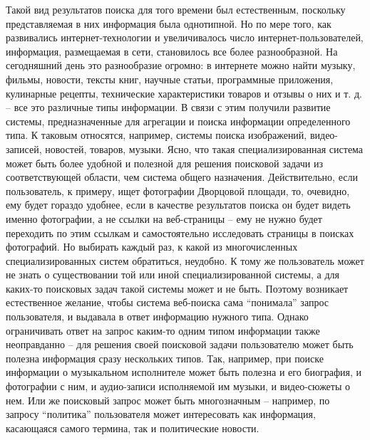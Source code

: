 \documentclass[12pt,a4paper]{report}
\newcommand\note[1]{\textcolor{red}{(#1)}}
\begin{document}
Такой вид результатов поиска для того времени был естественным, поскольку представляемая в них информация была однотипной.
Но по мере того, как развивались интернет-технологии и увеличивалось число интернет-пользователей, информация, размещаемая в сети, становилось все более разнообразной. На сегодняшний день это разнообразие огромно: в интернете можно найти музыку, фильмы, новости, тексты книг, научные статьи, программные приложения, кулинарные рецепты, технические характеристики товаров и отзывы о них и т. д. -- все это различные типы информации. В связи с этим получили развитие системы, предназначенные для агрегации и поиска информации определенного типа. К таковым относятся, например, системы поиска изображений, видео-записей, новостей, товаров, музыки. 
Ясно, что такая специализированная система может быть более удобной и полезной для решения поисковой задачи из соответствующей области, чем система общего назначения. 
Действительно, если пользователь, к примеру, ищет фотографии Дворцовой площади, то, очевидно, ему будет гораздо удобнее, если в качестве результатов поиска он будет видеть именно фотографии, а не ссылки на веб-страницы -- ему не нужно будет переходить по этим ссылкам и самостоятельно исследовать страницы в поисках фотографий.
Но выбирать каждый раз, к какой из многочисленных специализированных систем обратиться, неудобно. К тому же пользователь может не знать о существовании той или иной специализированной системы, а для каких-то поисковых задач такой системы может и не быть. Поэтому возникает естественное желание, чтобы система веб-поиска сама ``понимала'' запрос пользователя, и выдавала в ответ информацию нужного типа. Однако ограничивать ответ на запрос каким-то одним типом информации также неоправданно -- для решения своей поисковой задачи пользователю может быть полезна информация сразу нескольких типов. Так, например, при поиске информации о музыкальном исполнителе может быть полезна и его биография, и фотографии с ним, и аудио-записи исполняемой им музыки, и видео-сюжеты о нем. Или же поисковый запрос может быть многозначным -- например, по запросу ``политика'' пользователя может интересовать как информация, касающаяся самого термина, так и политические новости. 
\end{document}
